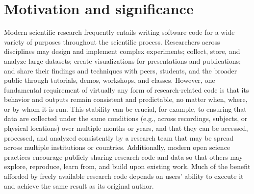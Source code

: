 \documentclass[preprint,12pt, a4paper]{elsarticle}
\begin{document}
\section{Motivation and significance}
Modern scientific research frequently entails writing software code for a wide variety of purposes throughout the scientific process.
Researchers across disciplines may design and implement complex experiments; collect, store, and analyze large datasets; create visualizations for presentations and publications; and share their findings and techniques with peers, students, and the broader public through tutorials, demos, workshops, and classes.
However, one fundamental requirement of virtually any form of research-related code is that its behavior and outputs remain consistent and predictable, no matter when, where, or by whom it is run.
This stability can be crucial, for example, to ensuring that data are collected under the same conditions (e.g., across recordings, subjects, or physical locations)
over multiple months or years, and that they can be accessed, processed, and analyzed consistently by a research team that may be spread across multiple institutions or countries.
Additionally, modern open science practices encourage publicly sharing research code and data so that others may explore, reproduce, learn from, and build upon existing work.
Much of the benefit afforded by freely available research code depends on users' ability to execute it and achieve the same result as its original author.
\end{document}
